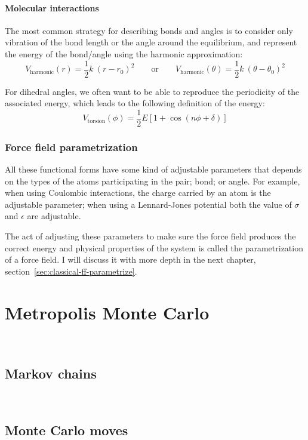 \documentclass[thesis]{subfiles}
\begin{document}
\paragraph{Molecular interactions} The most common strategy for describing bonds
and angles is to consider only vibration of the bond length or the angle around
the equilibrium, and represent the energy of the bond/angle using the harmonic
approximation:
\[V_\text{harmonic}(r) = \frac 12 k \ (r - r_0)^2  \qquad\text{or}\qquad V_\text{harmonic}(\theta) = \frac 12 k \ (\theta - \theta_0)^2 \]

For dihedral angles, we often want to be able to reproduce the periodicity of
the associated energy, which leads to the following definition of the energy:
\[V_\text{torsion}(\phi) = \frac 12 E \left[1 + \cos(n \phi + \delta)\right] \]

\subsubsection{Force field parametrization}

All these functional forms have some kind of adjustable parameters that depends
on the types of the atoms participating in the pair; bond; or angle. For
example, when using Coulombic interactions, the charge carried by an atom is the
adjustable parameter; when using a Lennard-Jones potential both the value of
$\sigma$ and $\epsilon$ are adjustable.

The act of adjusting these parameters to make sure the force field produces the
correct energy and physical properties of the system is called the
parametrization of a force field. I will discuss it with more depth in the next
chapter, section~\ref{sec:classical-ff-parametrize}.

\section{Metropolis Monte Carlo}
~


\subsection{Markov chains}
~

\subsection{Monte Carlo moves}
~
\end{document}
